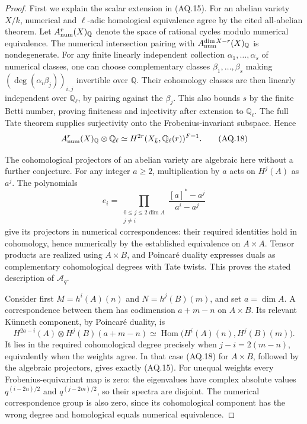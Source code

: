 \documentclass[11pt,a4paper]{article}
\theoremstyle{definition}\newtheorem{definition}[theorem]{Definition}
\theoremstyle{remark}\newtheorem{remark}[theorem]{Remark}
\begin{document}
\begin{proof}
First we explain the scalar extension in (AQ.15).
For an abelian variety $X/k$, numerical and
$\ell$-adic homological equivalence agree by the
cited all-abelian theorem. Let $A^r_{\rm num}(X)_{\mathbb Q}$
denote the space of rational cycles modulo numerical
equivalence. The numerical intersection pairing
with $A^{\dim X-r}_{\rm num}(X)_{\mathbb Q}$ is nondegenerate.
For any finite linearly independent collection
$\alpha_1,\ldots,\alpha_s$ of numerical classes,
one can choose complementary classes
$\beta_1,\ldots,\beta_s$ making
$(\deg(\alpha_i\beta_j))_{i,j}$ invertible over
$\mathbb Q$. Their cohomology classes are then
linearly independent over $\mathbb Q_\ell$, by
pairing against the $\beta_j$. This also bounds
$s$ by the finite Betti number, proving finiteness
and injectivity after extension to $\mathbb Q_\ell$.
The full Tate theorem supplies surjectivity onto
the Frobenius-invariant subspace. Hence
\[
 A^r_{\rm num}(X)_{\mathbb Q}\otimes\mathbb Q_\ell
 \simeq H^{2r}(X_{\bar k},\mathbb Q_\ell(r))^{F=1}.
                                                               \tag{AQ.18}
\]

The cohomological projectors of an abelian variety
are algebraic here without a further conjecture.
For any integer $a\geq2$, multiplication by $a$
acts on $H^j(A)$ as $a^j$. The polynomials
\[
 e_i=\prod_{\substack{0\leq j\leq2\dim A\\j\ne i}}
       \frac{[a]^*-a^j}{a^i-a^j}
\]
give its projectors in numerical correspondences:
their required identities hold in cohomology,
hence numerically by the established equivalence
on $A\times A$. Tensor products are realized
using $A\times B$, and Poincar\'e duality expresses
duals as complementary cohomological degrees
with Tate twists. This proves the stated description
of $\mathcal A_q$.

Consider first $M=h^i(A)(n)$ and $N=h^j(B)(m)$,
and set $a=\dim A$. A correspondence between them
has codimension $a+m-n$ on $A\times B$. Its
relevant K\"unneth component, by Poincar\'e duality,
is
\[
 H^{2a-i}(A)\otimes H^j(B)(a+m-n)
 \simeq\operatorname{Hom}\bigl(H^i(A)(n),H^j(B)(m)\bigr).
\]
It lies in the required cohomological degree
precisely when $j-i=2(m-n)$, equivalently when
the weights agree. In that case (AQ.18) for
$A\times B$, followed by the algebraic projectors,
gives exactly (AQ.15). For unequal weights every
Frobenius-equivariant map is zero: the eigenvalues
have complex absolute values $q^{(i-2n)/2}$ and
$q^{(j-2m)/2}$, so their spectra are disjoint.
The numerical correspondence group is also zero,
since its cohomological component has the wrong
degree and homological equals numerical equivalence.


\end{proof}
\end{document}
